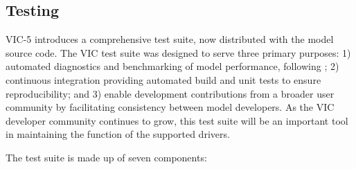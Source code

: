 \documentclass[gmd, manuscript]{copernicus}
\begin{document}
  \subsection{Testing}
    \label{sec:testing}
    VIC-5 introduces a comprehensive test suite, now distributed with the model source code. The VIC test suite was designed to serve three primary purposes: 1) automated diagnostics and benchmarking of model performance, following \citet{Luo_2012};
    2) continuous integration providing automated build and unit tests to ensure reproducibility; and 3) enable development contributions from a broader user community by facilitating consistency between model developers. As the VIC developer community continues to grow, this test suite will be an important tool in maintaining the function of the supported drivers.

    The test suite is made up of seven components:
\end{document}
